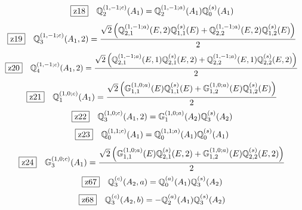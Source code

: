 \documentclass[fleqn,10pt,landscape]{jsarticle}
\begin{document}
\begin{dmath*}
\hspace*{3mm}\fbox{z18}\quad \mathbb{Q}_{2}^{(1,-1;c)}(A_{1})=\mathbb{Q}_{2}^{(1,-1;a)}(A_{1}) \mathbb{Q}_{0}^{(s)}(A_{1})
\end{dmath*}
\begin{dmath*}
\hspace*{3mm}\fbox{z19}\quad \mathbb{Q}_{3}^{(1,-1;c)}(A_{1},2)=\frac{\sqrt{2} \left(\mathbb{Q}_{2,1}^{(1,-1;a)}(E,2) \mathbb{Q}_{1,1}^{(s)}(E) + \mathbb{Q}_{2,2}^{(1,-1;a)}(E,2) \mathbb{Q}_{1,2}^{(s)}(E)\right)}{2}
\end{dmath*}
\begin{dmath*}
\hspace*{3mm}\fbox{z20}\quad \mathbb{Q}_{4}^{(1,-1;c)}(A_{1},2)=\frac{\sqrt{2} \left(\mathbb{Q}_{2,1}^{(1,-1;a)}(E,1) \mathbb{Q}_{2,1}^{(s)}(E,2) + \mathbb{Q}_{2,2}^{(1,-1;a)}(E,1) \mathbb{Q}_{2,2}^{(s)}(E,2)\right)}{2}
\end{dmath*}
\begin{dmath*}
\hspace*{3mm}\fbox{z21}\quad \mathbb{Q}_{1}^{(1,0;c)}(A_{1})=\frac{\sqrt{2} \left(\mathbb{G}_{1,1}^{(1,0;a)}(E) \mathbb{Q}_{1,1}^{(s)}(E) + \mathbb{G}_{1,2}^{(1,0;a)}(E) \mathbb{Q}_{1,2}^{(s)}(E)\right)}{2}
\end{dmath*}
\begin{dmath*}
\hspace*{3mm}\fbox{z22}\quad \mathbb{Q}_{3}^{(1,0;c)}(A_{1},2)=\mathbb{G}_{1}^{(1,0;a)}(A_{2}) \mathbb{Q}_{3}^{(s)}(A_{2})
\end{dmath*}
\begin{dmath*}
\hspace*{3mm}\fbox{z23}\quad \mathbb{Q}_{0}^{(1,1;c)}(A_{1})=\mathbb{Q}_{0}^{(1,1;a)}(A_{1}) \mathbb{Q}_{0}^{(s)}(A_{1})
\end{dmath*}
\begin{dmath*}
\hspace*{3mm}\fbox{z24}\quad \mathbb{G}_{3}^{(1,0;c)}(A_{1})=\frac{\sqrt{2} \left(\mathbb{G}_{1,1}^{(1,0;a)}(E) \mathbb{Q}_{2,1}^{(s)}(E,2) + \mathbb{G}_{1,2}^{(1,0;a)}(E) \mathbb{Q}_{2,2}^{(s)}(E,2)\right)}{2}
\end{dmath*}
\begin{dmath*}
\hspace*{3mm}\fbox{z67}\quad \mathbb{Q}_{3}^{(c)}(A_{2},a)=\mathbb{Q}_{0}^{(a)}(A_{1}) \mathbb{Q}_{3}^{(s)}(A_{2})
\end{dmath*}
\begin{dmath*}
\hspace*{3mm}\fbox{z68}\quad \mathbb{Q}_{3}^{(c)}(A_{2},b)=- \mathbb{Q}_{2}^{(a)}(A_{1}) \mathbb{Q}_{3}^{(s)}(A_{2})
\end{dmath*}
\end{document}
